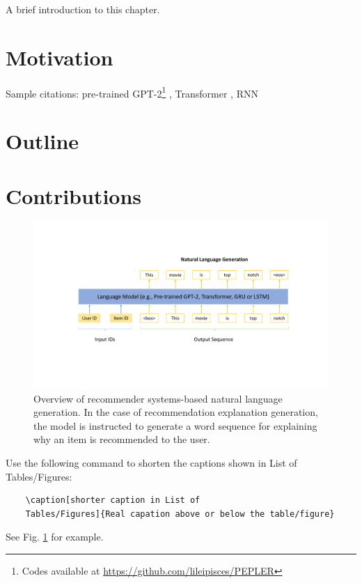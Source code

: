A brief introduction to this chapter.

\section{Motivation}

Sample citations: pre-trained GPT-2\footnote{Codes available at \url{https://github.com/lileipisces/PEPLER}} \cite{22-PEPLER}, Transformer \cite{ACL21-PETER}, RNN \cite{CIKM20-NETE}

\section{Outline}

\section{Contributions}

\begin{figure}
	\centering
	\includegraphics[scale=0.5]{fig/ch1/NLG4RS.pdf}
	\caption[Overview of recommender systems-based natural language generation.]{Overview of recommender systems-based natural language generation. In the case of recommendation explanation generation, the model is instructed to generate a word sequence for explaining why an item is recommended to the user.}
	\label{fig1:model}
\end{figure}

Use the following command to shorten the captions shown in List of Tables/Figures:
\begin{verbatim}
	\caption[shorter caption in List of
	Tables/Figures]{Real capation above or below the table/figure}
\end{verbatim}
See Fig. \ref{fig1:model} for example.
